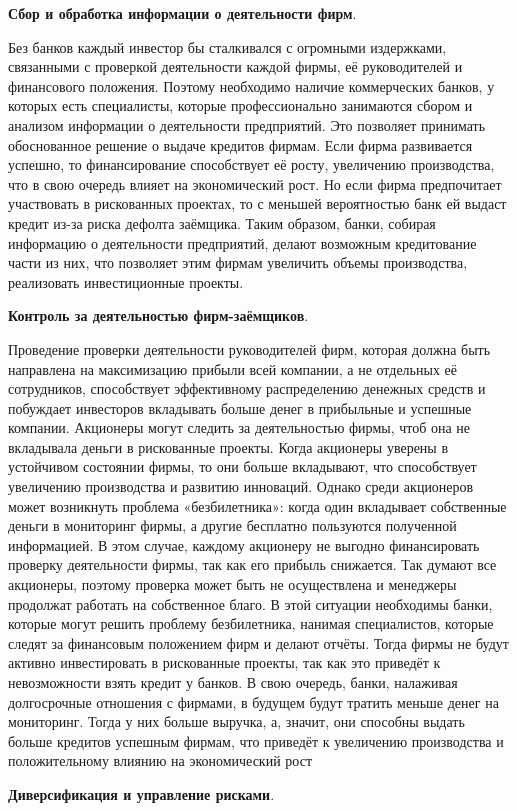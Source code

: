 \begin{Enumerate}
	\item \textbf{Сбор и обработка информации о деятельности фирм}.
	
	Без банков каждый инвестор бы сталкивался с огромными издержками, связанными с проверкой деятельности каждой фирмы, её руководителей и финансового положения. Поэтому необходимо наличие коммерческих банков, у которых есть специалисты, которые профессионально занимаются сбором и анализом информации о деятельности предприятий. Это позволяет принимать обоснованное решение о выдаче кредитов фирмам. Если фирма развивается успешно, то финансирование способствует её росту, увеличению производства, что в свою очередь влияет на экономический рост. Но если фирма предпочитает участвовать в рискованных проектах, то с меньшей вероятностью банк ей выдаст кредит из-за риска дефолта заёмщика. Таким образом, банки, собирая информацию о деятельности предприятий, делают возможным кредитование части из них, что позволяет этим фирмам увеличить объемы производства, реализовать инвестиционные проекты.
	\item \textbf{Контроль за деятельностью фирм-заёмщиков}.
	
	Проведение проверки деятельности руководителей фирм, которая должна быть направлена на максимизацию прибыли всей компании, а не отдельных её сотрудников, способствует эффективному распределению денежных средств и побуждает инвесторов вкладывать больше денег в прибыльные и успешные компании. Акционеры могут следить за деятельностью фирмы, чтоб она не вкладывала деньги в рискованные проекты. Когда акционеры уверены в устойчивом состоянии фирмы, то они больше вкладывают, что способствует увеличению производства и развитию инноваций. Однако среди акционеров может возникнуть проблема «безбилетника»: когда один вкладывает собственные деньги в мониторинг фирмы, а другие бесплатно пользуются полученной информацией. В этом случае, каждому акционеру не выгодно финансировать проверку деятельности фирмы, так как его прибыль снижается. Так думают все акционеры, поэтому проверка может быть не осуществлена и менеджеры продолжат работать на собственное благо. В этой ситуации необходимы банки, которые могут решить проблему безбилетника, нанимая специалистов, которые следят за финансовым положением фирм и делают отчёты. Тогда фирмы не будут активно инвестировать в рискованные проекты, так как это приведёт к невозможности взять кредит у банков. В свою очередь, банки, налаживая долгосрочные отношения с фирмами, в будущем будут тратить меньше денег на мониторинг. Тогда у них больше выручка, а, значит, они способны выдать больше кредитов успешным фирмам, что приведёт к увеличению производства и положительному влиянию на экономический рост
	\item \textbf{Диверсификация и управление рисками}.
	

\end{Enumerate}
